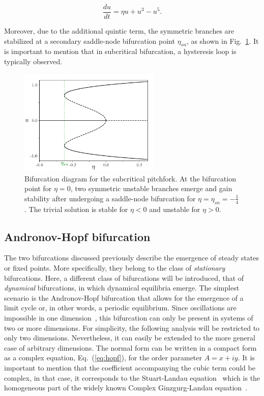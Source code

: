 \begin{equation}
    \dfrac{du}{dt} = \eta u + u ^ 3 - u^5.
    \label{eq:pre_bif_pitchfork_subcritical}
\end{equation}

Moreover, due to the additional quintic term, the symmetric branches are stabilized 
at a secondary saddle-node bifurcation point $\eta_{sn}$, as shown
in Fig.~\ref{fig:pre_bif_subpitchfork}. It is important to mention that in subcritical
bifurcation, a hysteresis loop is typically observed. 

\begin{figure}[h]
    \centering
    \includegraphics[width=0.6\textwidth]{imagenes/framework/bif_pitch_subcritical.pdf}
    \caption{Bifurcation diagram for the subcritical pitchfork. At the bifurcation point
    for $\eta=0$, two symmetric unstable branches emerge and gain stability after undergoing
    a saddle-node bifurcation for $\eta=\eta_{sn}=-\frac14$. The trivial solution is stable for $\eta < 0$
    and unstable for $\eta > 0$.}
    \label{fig:pre_bif_subpitchfork}
\end{figure}


\subsection{Andronov-Hopf bifurcation}

The two bifurcations discussed previously describe the emergence of steady states or fixed points. 
More specifically, they belong to the class of {\em stationary} bifurcations. Here, a different class of bifurcations will be introduced,
that of {\em dynamical} bifurcations, in which dynamical equilibria emerge. The simplest scenario is the Andronov-Hopf bifurcation
that allows for the emergence of a limit cycle or, in other words, a periodic equilibrium. Since oscillations are impossible in 
one dimension~\cite{strogatz2018nonlinear}, this bifurcation can only be present in systems of two or more dimensions. For simplicity, the following
analysis will be restricted to only two dimensions. Nevertheless, it can easily be extended to the more general case of arbitrary dimensions.
The normal form can be written in a compact form as a complex equation, Eq.~(\ref{eq:hopf}), for the
order parameter $A = x +iy$. It is important to mention that
the coefficient accompanying the cubic term could be complex, in that case, it corresponds to
the Stuart-Landau equation~\cite{landau1944problem,stuart1958non} which
is the homogeneous part of the widely known Complex Ginzgurg-Landau equation~\cite{aranson2002world}.

